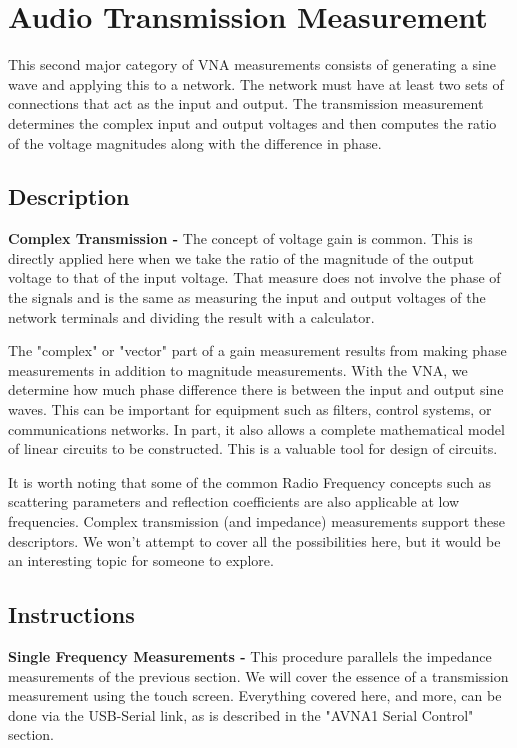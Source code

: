 \section{Audio Transmission Measurement}
\label{sect:Trans}
This second major category of VNA measurements consists of generating a sine wave and applying this to a network. The network must have at least two sets of connections that act as the input and output. The transmission measurement determines the complex input and output voltages and then computes the ratio of the voltage magnitudes along with the difference in phase.
%
\subsection{Description}
\label{subsect:TDescr}
\textbf{Complex Transmission - }The concept of voltage gain  is common.
This is directly applied here when we take the ratio of the magnitude of the output voltage to that of the input voltage. That measure does not involve the phase of the signals and is the same as measuring the input and output voltages of the network terminals and dividing the result with a calculator.

The "complex" or "vector" part of a gain measurement results from making phase measurements in addition to magnitude measurements. With the VNA, we determine how much phase difference there is between the input and output sine waves.
This can be important for equipment such as  filters, control systems, or communications networks. In part, it also allows a complete mathematical model of linear circuits to be constructed.  This is a valuable tool for design of circuits.

It is worth noting that some of the common Radio Frequency concepts such as scattering parameters and reflection coefficients are also applicable at low frequencies.  Complex transmission (and impedance) measurements support these descriptors.  We won't attempt to cover all the possibilities here, but it would be an interesting topic for someone to explore.

\subsection{Instructions}
\label{subsect:TInstr}
\textbf{Single Frequency Measurements - }This procedure parallels the impedance measurements of the previous section. We will cover the essence of a transmission measurement using the touch screen. Everything covered here, and more, can be done via the USB-Serial link, as is described in the "AVNA1 Serial Control" section.

